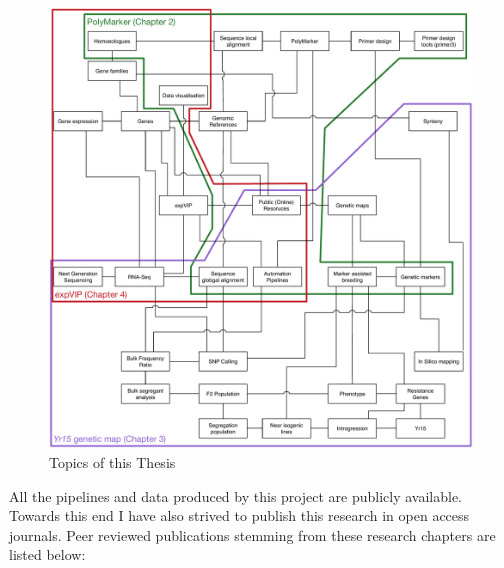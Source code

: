 \begin{figure}
\centering
\includegraphics[width=1\textwidth]{Introduction/RicardoThesisTopics.pdf}
\caption{Topics of this Thesis}
\label{fig:intr:topics}
\end{figure}


All the pipelines and data produced by this project are publicly available. Towards this end I have also strived to publish this research in open access journals. Peer reviewed publications stemming from these research chapters are listed below: 

